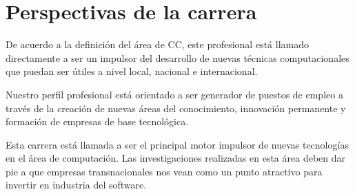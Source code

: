 \section{Perspectivas de la carrera}\label{sec:cs-perspectivas-de-la-carrera}
De acuerdo a la definición del área de \ac{CC}, este profesional está llamado directamente a ser un impulsor del desarrollo de nuevas técnicas computacionales que puedan ser útiles a nivel local, nacional e internacional.

Nuestro perfil profesional está orientado a ser generador de puestos de empleo a través 
de la creación de nuevas áreas del conocimiento, innovación permanente y formación de
empresas de base tecnológica.

Esta carrera está llamada a ser el principal motor impulsor de nuevas tecnologí­as en el área de computación. Las investigaciones realizadas en esta área deben dar pie a que empresas transnacionales nos vean como un punto atractivo para invertir en industria del software.
